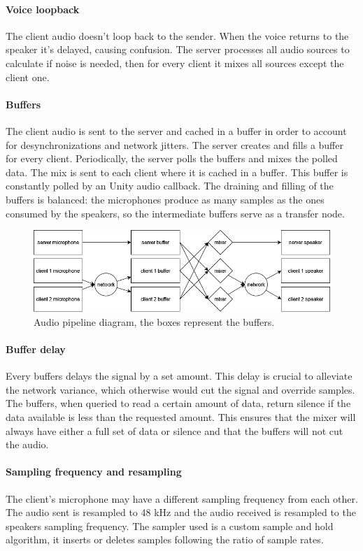 \documentclass[12pt]{article}
\begin{document}
\paragraph{Voice loopback}
The client audio doesn't loop back to the sender. When the voice returns to the speaker it's delayed, causing confusion. The server processes all audio sources to calculate if noise is needed, then for every client it mixes all sources except the client one.
\paragraph{Buffers}
The client audio is sent to the server and cached in a buffer in order to account for desynchronizations and network jitters. The server creates and fills a buffer for every client. Periodically, the server polls the buffers and mixes the polled data. The mix is sent to each client where it is cached in a buffer. This buffer is constantly polled by an Unity audio callback. The draining and filling of the buffers is balanced: the microphones produce as many samples as the ones consumed by the speakers, so the intermediate buffers serve as a transfer node. 

\begin{figure}[H]
\includegraphics[width=\textwidth]{audio_mixer}
\caption{Audio pipeline diagram, the boxes represent the buffers.}
\end{figure}

\paragraph{Buffer delay}
Every buffers delays the signal by a set amount. This delay is crucial to alleviate the network variance, which otherwise would cut the signal and override samples. The buffers, when queried to read a certain amount of data, return silence if the data available is less than the requested amount. This ensures that the mixer will always have either a full set of data or silence and that the buffers will not cut the audio.

\clearpage

\paragraph{Sampling frequency and resampling}
The client's microphone may have a different sampling frequency from each other. The audio sent is resampled to 48 kHz and the audio received is resampled to the speakers sampling frequency. The sampler used is a custom sample and hold algorithm, it inserts or deletes samples following the ratio of sample rates.
\end{document}
